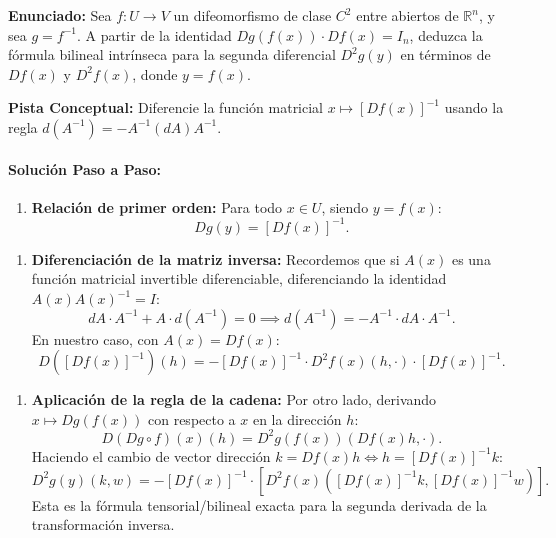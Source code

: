 \documentclass[11pt,a4paper]{article}
\begin{document}
\begin{tcolorbox}[colback=white,colframe=gray!40,arc=1mm,boxrule=0.5pt,left=3mm,right=3mm,top=2mm,bottom=2mm]
\textbf{Enunciado:} Sea $f: U \to V$ un difeomorfismo de clase $C^2$ entre abiertos de $\mathbb{R}^n$, y sea $g = f^{-1}$. A partir de la identidad $Dg(f(x)) \cdot Df(x) = I_n$, deduzca la fórmula bilineal intrínseca para la segunda diferencial $D^2 g(y)$ en términos de $Df(x)$ y $D^2 f(x)$, donde $y = f(x)$.
\end{tcolorbox}

\begin{tcolorbox}[colback=yellow!4,colframe=accentamber!70,arc=1mm,boxrule=0.5pt,left=3mm,right=3mm,top=1.5mm,bottom=1.5mm]
\textbf{Pista Conceptual:} Diferencie la función matricial $x \mapsto [Df(x)]^{-1}$ usando la regla $d(A^{-1}) = -A^{-1} (dA) A^{-1}$.
\end{tcolorbox}

\paragraph{Solución Paso a Paso:}\par
\begin{enumerate}[label=\textbf{\arabic*.}]
\item \textbf{Relación de primer orden:}
Para todo $x \in U$, siendo $y = f(x)$:
\begin{equation*}
Dg(y) = [Df(x)]^{-1}.
\end{equation*}
\end{enumerate}

\begin{enumerate}[label=\textbf{\arabic*.}]
\item \textbf{Diferenciación de la matriz inversa:}
Recordemos que si $A(x)$ es una función matricial invertible diferenciable, diferenciando la identidad $A(x) A(x)^{-1} = I$:
\begin{equation*}
dA \cdot A^{-1} + A \cdot d(A^{-1}) = 0 \implies d(A^{-1}) = -A^{-1} \cdot dA \cdot A^{-1}.
\end{equation*}
En nuestro caso, con $A(x) = Df(x)$:
\begin{equation*}
D([Df(x)]^{-1})(h) = -[Df(x)]^{-1} \cdot D^2 f(x)(h, \cdot) \cdot [Df(x)]^{-1}.
\end{equation*}
\end{enumerate}

\begin{enumerate}[label=\textbf{\arabic*.}]
\item \textbf{Aplicación de la regla de la cadena:}
Por otro lado, derivando $x \mapsto Dg(f(x))$ con respecto a $x$ en la dirección $h$:
\begin{equation*}
D(Dg \circ f)(x)(h) = D^2 g(f(x))(Df(x)h, \cdot).
\end{equation*}
Haciendo el cambio de vector dirección $k = Df(x)h \iff h = [Df(x)]^{-1} k$:
\begin{equation*}
D^2 g(y)(k, w) = -[Df(x)]^{-1} \cdot \left[ D^2 f(x)\left([Df(x)]^{-1}k, [Df(x)]^{-1}w\right) \right].
\end{equation*}
Esta es la fórmula tensorial/bilineal exacta para la segunda derivada de la transformación inversa.
\end{enumerate}
\end{document}
